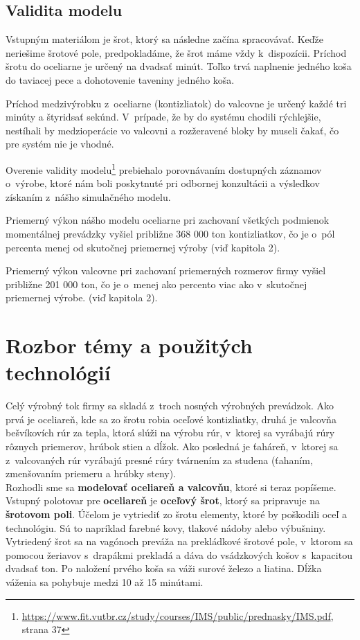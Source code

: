 \documentclass[]{article}
\begin{document}
\subsection{Validita modelu}
Vstupným materiálom je šrot, ktorý sa následne začína spracovávať. Keďže neriešime šrotové pole, predpokladáme, že šrot máme vždy k~dispozícii. Príchod šrotu do oceliarne je určený na dvadsať minút. Toľko trvá naplnenie jedného koša do taviacej pece a dohotovenie taveniny jedného koša.

Príchod medzivýrobku z~oceliarne (kontizliatok) do valcovne je určený každé tri minúty a štyridsať sekúnd. V~prípade, že by do systému chodili rýchlejšie, nestíhali by medzioperácie vo valcovni a rozžeravené bloky by museli čakať, čo pre systém nie je vhodné.

Overenie validity modelu\footnote{\url{https://www.fit.vutbr.cz/study/courses/IMS/public/prednasky/IMS.pdf}, strana 37} prebiehalo porovnávaním dostupných záznamov o~výrobe, ktoré nám boli poskytnuté pri odbornej konzultácii a výsledkov získaním z~nášho simulačného modelu.

Priemerný výkon nášho modelu oceliarne pri zachovaní všetkých podmienok momentálnej prevádzky vyšiel približne 368 000 ton kontizliatkov, čo je o~pól percenta menej od skutočnej priemernej výroby (viď kapitola 2).

Priemerný výkon valcovne pri zachovaní priemerných rozmerov firmy vyšiel približne 201 000 ton, čo  je o~menej ako percento viac ako v~skutočnej priemernej výrobe. (viď kapitola 2).

\section{Rozbor témy a použitých technológií}
Celý výrobný tok firmy sa skladá z~troch nosných výrobných prevádzok. Ako prvá je oceliareň, kde sa zo šrotu robia oceľové kontizliatky, druhá je valcovňa bešvíkovích rúr za tepla, ktorá slúži na výrobu rúr, v~ktorej sa vyrábajú rúry rôznych priemerov, hrúbok stien a dĺžok. Ako posledná je ťaháreň, v~ktorej sa z~valcovaných rúr vyrábajú presné rúry tvárnením za studena (ťahaním, zmenšovaním priemeru a hrúbky steny).\\

Rozhodli sme sa \textbf{modelovať oceliareň a valcovňu}, ktoré si teraz popíšeme.\\ Vstupný polotovar pre \textbf{oceliareň} je \textbf{oceľový šrot}, ktorý sa pripravuje na \textbf{šrotovom poli}. Účelom je vytriediť zo šrotu elementy, ktoré by poškodili oceľ a technológiu. Sú to napríklad farebné kovy, tlakové nádoby alebo výbušniny.  Vytriedený šrot sa na vagónoch preváža na prekládkové šrotové pole, v~ktorom sa pomocou žeriavov s~drapákmi prekladá  a dáva do vsádzkových košov s~kapacitou dvadsať ton. Po naložení prvého koša sa váži surové železo a liatina. Dĺžka váženia sa pohybuje medzi 10 až 15 minútami.
\end{document}
